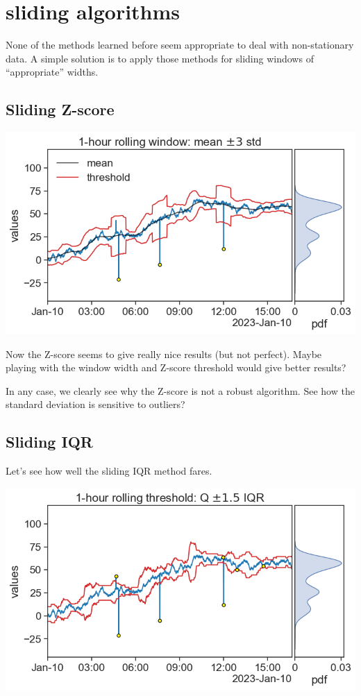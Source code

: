 \documentclass[
  letterpaper,
  DIV=11,
  numbers=noendperiod,
  oneside]{scrreprt}
\begin{document}
\hypertarget{sliding-algorithms}{%
\chapter{sliding algorithms}\label{sliding-algorithms}}

None of the methods learned before seem appropriate to deal with
non-stationary data. A simple solution is to apply those methods for
sliding windows of ``appropriate'' widths.

\hypertarget{sliding-z-score}{%
\section{Sliding Z-score}\label{sliding-z-score}}

\includegraphics{outliers/outliers_rolling_3std.png}

Now the Z-score seems to give really nice results (but not perfect).
Maybe playing with the window width and Z-score threshold would give
better results?

In any case, we clearly see why the Z-score is not a robust algorithm.
See how the standard deviation is sensitive to outliers?

\hypertarget{sliding-iqr}{%
\section{Sliding IQR}\label{sliding-iqr}}

Let's see how well the sliding IQR method fares.

\includegraphics{outliers/outliers_rolling_IQR.png}
\end{document}
